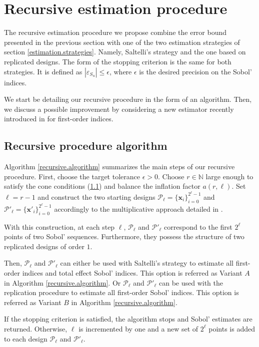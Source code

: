 \documentclass[]{elsarticle}
\theoremstyle{definition}
\newcommand{\bvec}[1]{\boldsymbol{#1}}
\newcommand{\vx}{\bvec{x}}
\def\abs#1{\ensuremath{\left \lvert #1 \right \rvert}}
\begin{document}
\section{Recursive estimation procedure}
\label{section.recursive.procedure}

The recursive estimation procedure we propose combine the error bound presented in the previous section with one of the two estimation strategies of section \ref{estimation.strategies}. Namely, Saltelli's strategy and the one based on replicated designs. The form of the stopping criterion is the same for both strategies. It is defined as $\abs{\varepsilon_{S_u}} \leq \epsilon$, where $\epsilon$ is the desired precision on the Sobol' indices.

We start be detailing our recursive procedure in the form of an algorithm. Then, we discuss a possible improvement by considering a new estimator recently introduced in \cite{Owen} for first-order indices.

\subsection{Recursive procedure algorithm}

Algorithm \ref{recursive.algorithm} summarizes the main steps of our recursive procedure. First, choose the target tolerance $\epsilon >0$. Choose $r \in \mathbb{N}$ large enough to satisfy the cone conditions (\ref{}) and balance the inflation factor $a(r,\ell)$. Set $\ell=r-1$ and construct the two starting designs $\mathcal{P}_{\ell}=\{\vx_i\}_{i=0}^{2^\ell-1}$ and $\mathcal{P}'_{\ell}=\{\vx'_i\}_{i=0}^{2^\ell-1}$ accordingly to the multiplicative approach detailed in \cite{crass}.

With this construction, at each step $\ell$, $\mathcal{P}_{\ell}$ and $\mathcal{P}'_{\ell}$ correspond to the first $2^\ell$ points of two Sobol' sequences. Furthermore, they possess the structure of two replicated designs of order $1$.
\bigskip

Then, $\mathcal{P}_{\ell}$ and $\mathcal{P}'_{\ell}$ can either be used with Saltelli's strategy to estimate all first-order indices and total effect Sobol' indices. This option is referred as Variant $A$ in Algorithm \ref{recursive.algorithm}. Or $\mathcal{P}_{\ell}$ and $\mathcal{P}'_{\ell}$ can be used with the replication procedure to estimate all first-order Sobol' indices. This option is referred as Variant $B$ in Algorithm \ref{recursive.algorithm}.

If the stopping criterion is satisfied, the algorithm stops and Sobol' estimates are returned. Otherwise, $\ell$ is incremented by one and a new set of $2^{\ell}$ points is added to each design $\mathcal{P}_{\ell}$ and $\mathcal{P}'_{\ell}$. 
\end{document}
